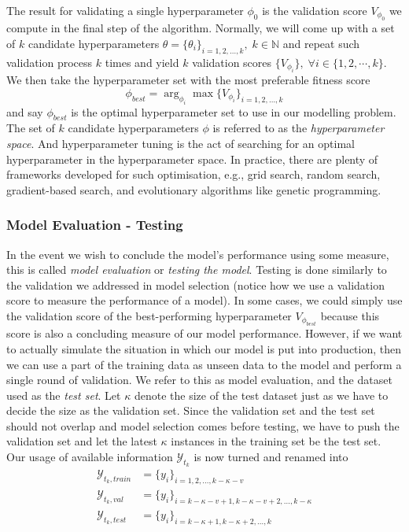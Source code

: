 The result for validating a single hyperparameter $\phi_0$ is the validation score $V_{\phi_0}$ we compute in the final step of the algorithm. Normally, we will come up with a set of $k$ candidate hyperparameters $\theta = \{ \theta_i \}_{i = 1, 2, \ldots, k}, \; k \in \mathbb{N}$ and repeat such validation process $k$ times and yield $k$ validation scores $\{ V_{\phi_i} \}, \; \forall i \in \{1, 2, \cdots, k \}$. We then take the hyperparameter set with the most preferable fitness score
\begin{equation*} 
    \phi_{best} = \arg_{\phi_i} \max \{ V_{\phi_i} \}_{i = 1, 2, \ldots, k}
\end{equation*}
and say $\phi_{best}$ is the optimal hyperparameter set to use in our modelling problem. The set of $k$ candidate hyperparameters $\phi$ is referred to as the \textit{hyperparameter space}. And hyperparameter tuning is the act of searching for an optimal hyperparameter in the hyperparameter space. In practice, there are plenty of frameworks developed for such optimisation, e.g., grid search, random search, gradient-based search, and evolutionary algorithms like genetic programming.

\subsubsection{Model Evaluation - Testing}
In the event we wish to conclude the model's performance using some measure, this is called \textit{model evaluation} or \textit{testing the model}. Testing is done similarly to the validation we addressed in model selection (notice how we use a validation score to measure the performance of a model). In some cases, we could simply use the validation score of the best-performing hyperparameter $V_{\phi_{best}}$ because this score is also a concluding measure of our model performance. However, if we want to actually simulate the situation in which our model is put into production, then we can use a part of the training data as unseen data to the model and perform a single round of validation. We refer to this as model evaluation, and the dataset used as the \textit{test set}. Let $\kappa$ denote the size of the test dataset just as we have to decide the size as the validation set. Since the validation set and the test set should not overlap and model selection comes before testing, we have to push the validation set and let the latest $\kappa$ instances in the training set be the test set. Our usage of available information $\mathcal{Y}_{t_k}$ is now turned and renamed into
\begin{align*}
    \mathcal{Y}_{t_k, train} &= \{y_i \}_{i = 1, 2, \ldots, k - \kappa - v}                 \\
    \mathcal{Y}_{t_k, val} &= \{y_i \}_{i = k-\kappa-v+1,k-\kappa-v+2, \ldots, k-\kappa}  \\
    \mathcal{Y}_{t_k, test} &= \{y_i \}_{i = k-\kappa+1,k-\kappa+2, \ldots, k}
\end{align*}

